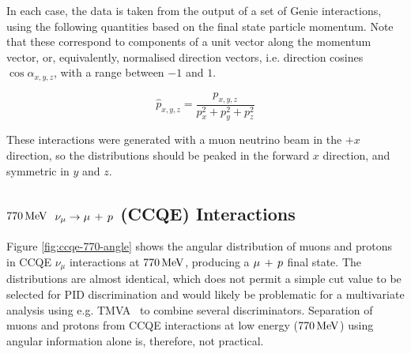 In each case, the data is taken from the output of a set of Genie interactions, using the following quantities based on the final state particle momentum. Note that these correspond to components of a unit vector along the momentum vector, or, equivalently, normalised direction vectors, i.e. direction cosines $\cos\alpha_{x,y,z}$, with a range between $-1$ and $1$.

\begin{equation}\label{eqn:angular_variables}
    \hat{p}_{x,y,z} = \frac{p_{x,y,z}}{p_x^2 + p_y^2 + p_z^2}
\end{equation}

These interactions were generated with a muon neutrino beam in the $+x$ direction, so the distributions should be peaked in the forward $x$ direction, and symmetric in $y$ and $z$.

\subsection{$770\,\mathrm{MeV}$ $\nu_\mu \rightarrow \mu\,+\,p$ (CCQE) Interactions}
Figure \ref{fig:ccqe-770-angle} shows the angular distribution of muons and protons in \acs{CCQE} $\nu_\mu$ interactions at $770\,\mathrm{MeV}$, producing a $\mu\,+\,p$ final state. The distributions are almost identical, which does not permit a simple cut value to be selected for PID discrimination and would likely be problematic for a multivariate analysis using e.g. TMVA~\citep{TMVA} to combine several discriminators. Separation of muons and protons from \acs{CCQE} interactions at low energy ($770\,\mathrm{MeV}$) using angular information alone is, therefore, not practical.

